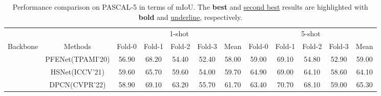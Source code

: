 \documentclass[10pt,twocolumn,letterpaper]{article}
\begin{document}
\begin{table*}[htbp]
	\renewcommand\tabcolsep{3.7pt}
	\centering
	\caption{Performance comparison on PASCAL-5 in terms of mIoU. The \textbf{best} and \underline{second best} results are highlighted with \textbf{bold} and \underline{underline}, respectively.}
	\begin{tabular}{c|ccccccccccc}
		\hline{\tiny {\tiny }}
		& \multicolumn{1}{c|}{}                             & \multicolumn{5}{c|}{1-shot}                                                                                                                                                                                                     & \multicolumn{5}{c}{5-shot}                                                                                                                                                      \\ \cline{3-12} 
		\multirow{-2}{*}{Backbone} & \multicolumn{1}{c|}{\multirow{-2}{*}{Methods}}    & Fold-0                                 & Fold-1                                 & Fold-2                                 & Fold-3                                 & \multicolumn{1}{c|}{Mean}                                   & Fold-0                        & Fold-1                                & Fold-2                        & Fold-3                                 & Mean                          \\ \hline
		& \multicolumn{1}{c|}{PFENet(TPAMI'20)\cite{pfenet}}                       & 56.90                                  & 68.20                                  & 54.40                                  & 52.40                                  & \multicolumn{1}{c|}{58.00}                                  & 59.00                         & 69.10                                  & 54.80                         & 52.90                                  & 59.00                         \\
		& \multicolumn{1}{c|}{HSNet(ICCV'21)\cite{hsnet}}                       & 59.60                                  & 65.70                                  & 59.60                                  & 54.00                                  & \multicolumn{1}{c|}{59.70}                                  & 64.90                         & 69.00                                  & 64.10                         & 58.60                                  & 64.10                         \\
		& \multicolumn{1}{c|}{DPCN(CVPR'22)\cite{dpcn}}                         & 58.90                                  & 69.10                                  & 63.20                                  & 55.70                                  & \multicolumn{1}{c|}{61.70}                                  & 63.40                         & 70.70                                  & 68.10                         & 59.00                                  & 65.30                         \\

\end{tabular}
\end{table*}
\end{document}
